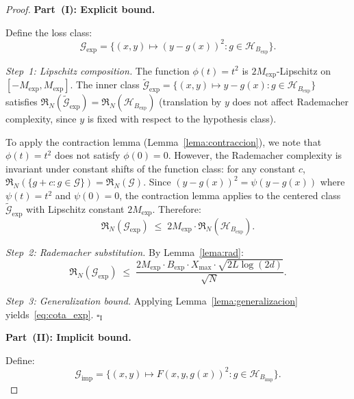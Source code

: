 \documentclass[12pt]{article}
\newcommand{\Rad}{\mathfrak{R}}
\begin{document}
\begin{proof}
\textbf{Part~(I): Explicit bound.}

Define the loss class:
\begin{equation}
  \mathcal{G}_{\mathrm{exp}} = \{(x,y) \mapsto (y - g(x))^2
  : g \in \mathcal{H}_{B_{\mathrm{exp}}}\}.
\end{equation}

\emph{Step~1: Lipschitz composition.}
The function $\phi(t) = t^2$ is $2M_{\mathrm{exp}}$-Lipschitz on
$[-M_{\mathrm{exp}}, M_{\mathrm{exp}}]$.
The inner class
$\tilde{\mathcal{G}}_{\mathrm{exp}} = \{(x,y) \mapsto y - g(x)
: g \in \mathcal{H}_{B_{\mathrm{exp}}}\}$
satisfies
$\Rad_N(\tilde{\mathcal{G}}_{\mathrm{exp}})
= \Rad_N(\mathcal{H}_{B_{\mathrm{exp}}})$
(translation by $y$ does not affect Rademacher complexity, since $y$
is fixed with respect to the hypothesis class).

To apply the contraction lemma (Lemma~\ref{lema:contraccion}), we
note that $\phi(t) = t^2$ does not satisfy $\phi(0) = 0$.
However, the Rademacher complexity is invariant under constant shifts
of the function class: for any constant $c$,
$\Rad_N(\{g + c : g \in \mathcal{G}\}) = \Rad_N(\mathcal{G})$.
Since $(y - g(x))^2 = \psi(y - g(x))$ where $\psi(t) = t^2$ and
$\psi(0) = 0$, the contraction lemma applies to the centered class
$\tilde{\mathcal{G}}_{\mathrm{exp}}$ with Lipschitz constant
$2M_{\mathrm{exp}}$.
Therefore:
\begin{equation}
  \Rad_N(\mathcal{G}_{\mathrm{exp}})
  \;\le\; 2M_{\mathrm{exp}} \cdot
  \Rad_N(\mathcal{H}_{B_{\mathrm{exp}}}).
\end{equation}

\emph{Step~2: Rademacher substitution.}
By Lemma~\ref{lema:rad}:
\begin{equation}
  \Rad_N(\mathcal{G}_{\mathrm{exp}})
  \;\le\; \frac{2 M_{\mathrm{exp}} \cdot B_{\mathrm{exp}} \cdot
    X_{\max} \cdot \sqrt{2L\log(2d)}}{\sqrt{N}}.
\end{equation}

\emph{Step~3: Generalization bound.}
Applying Lemma~\ref{lema:generalizacion} yields~\eqref{eq:cota_exp}.
\hfill $\square_{\mathrm{I}}$

\medskip

\textbf{Part~(II): Implicit bound.}

Define:
\begin{equation}
  \mathcal{G}_{\mathrm{imp}} = \{(x,y) \mapsto F(x,y,g(x))^2
  : g \in \mathcal{H}_{B_{\mathrm{imp}}}\}.
\end{equation}


\end{proof}
\end{document}

